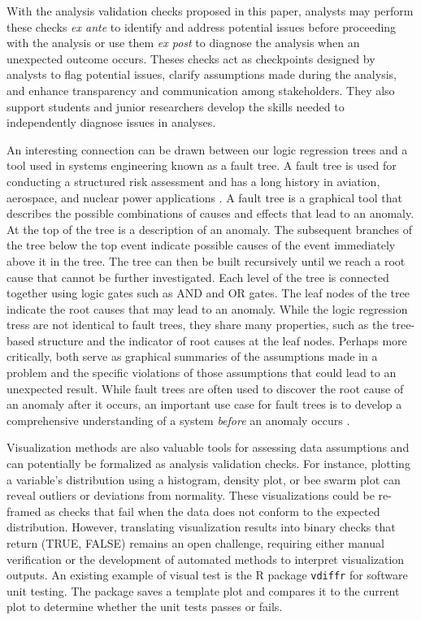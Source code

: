 \documentclass[
  12pt,
]{interact}
\begin{document}
With the analysis validation checks proposed in this paper, analysts may
perform these checks \emph{ex ante} to identify and address potential
issues before proceeding with the analysis or use them \emph{ex post} to
diagnose the analysis when an unexpected outcome occurs. Theses checks
act as checkpoints designed by analysts to flag potential issues,
clarify assumptions made during the analysis, and enhance transparency
and communication among stakeholders. They also support students and
junior researchers develop the skills needed to independently diagnose
issues in analyses.

An interesting connection can be drawn between our logic regression
trees and a tool used in systems engineering known as a fault tree. A
fault tree is used for conducting a structured risk assessment and has a
long history in aviation, aerospace, and nuclear power applications
\citep{vesely1981fault}. A fault tree is a graphical tool that describes
the possible combinations of causes and effects that lead to an anomaly.
At the top of the tree is a description of an anomaly. The subsequent
branches of the tree below the top event indicate possible causes of the
event immediately above it in the tree. The tree can then be built
recursively until we reach a root cause that cannot be further
investigated. Each level of the tree is connected together using logic
gates such as AND and OR gates. The leaf nodes of the tree indicate the
root causes that may lead to an anomaly. While the logic regression
tress are not identical to fault trees, they share many properties, such
as the tree-based structure and the indicator of root causes at the leaf
nodes. Perhaps more critically, both serve as graphical summaries of the
assumptions made in a problem and the specific violations of those
assumptions that could lead to an unexpected result. While fault trees
are often used to discover the root cause of an anomaly after it occurs,
an important use case for fault trees is to develop a comprehensive
understanding of a system \emph{before} an anomaly occurs
\citep{michael2002fault}.

Visualization methods are also valuable tools for assessing data
assumptions and can potentially be formalized as analysis validation
checks. For instance, plotting a variable's distribution using a
histogram, density plot, or bee swarm plot can reveal outliers or
deviations from normality. These visualizations could be re-framed as
checks that fail when the data does not conform to the expected
distribution. However, translating visualization results into binary
checks that return (TRUE, FALSE) remains an open challenge, requiring
either manual verification or the development of automated methods to
interpret visualization outputs. An existing example of visual test is
the R package \texttt{vdiffr} \citep{vdiffr} for software unit testing.
The package saves a template plot and compares it to the current plot to
determine whether the unit tests passes or fails.
\end{document}
